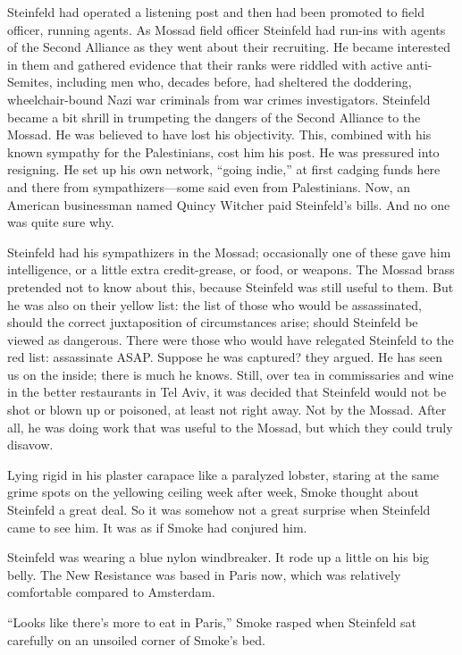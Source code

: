 Steinfeld had operated a listening post and then had been promoted to field officer, running agents. As Mossad field officer Steinfeld had run-ins with agents of the Second Alliance as they went about their recruiting. He became interested in them and gathered evidence that their ranks were riddled with active anti-Semites, including men who, decades before, had sheltered the doddering, wheelchair-bound Nazi war criminals from war crimes investigators. Steinfeld became a bit shrill in trumpeting the dangers of the Second Alliance to the Mossad. He was believed to have lost his objectivity. This, combined with his known sympathy for the Palestinians, cost him his post. He was pressured into resigning. He set up his own network, “going indie,” at first cadging funds here and there from sympathizers—some said even from Palestinians. Now, an American businessman named Quincy Witcher paid Steinfeld’s bills. And no one was quite sure why.

Steinfeld had his sympathizers in the Mossad; occasionally one of these gave him intelligence, or a little extra credit-grease, or food, or weapons. The Mossad brass pretended not to know about this, because Steinfeld was still useful to them. But he was also on their yellow list: the list of those who would be assassinated, should the correct juxtaposition of circumstances arise; should Steinfeld be viewed as dangerous. There were those who would have relegated Steinfeld to the red list: assassinate ASAP. Suppose he was captured? they argued. He has seen us on the inside; there is much he knows. Still, over tea in commissaries and wine in the better restaurants in Tel Aviv, it was decided that Steinfeld would not be shot or blown up or poisoned, at least not right away. Not by the Mossad. After all, he was doing work that was useful to the Mossad, but which they could truly disavow.

Lying rigid in his plaster carapace like a paralyzed lobster, staring at the same grime spots on the yellowing ceiling week after week, Smoke thought about Steinfeld a great deal. So it was somehow not a great surprise when Steinfeld came to see him. It was as if Smoke had conjured him.

Steinfeld was wearing a blue nylon windbreaker. It rode up a little on his big belly. The New Resistance was based in Paris now, which was relatively comfortable compared to Amsterdam.

“Looks like there’s more to eat in Paris,” Smoke rasped when Steinfeld sat carefully on an unsoiled corner of Smoke’s bed.

